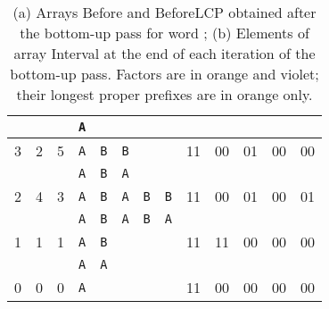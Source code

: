 \documentclass{llncs}
\newcommand{\Before}{\textsf{Before}}
\newcommand{\BeforeLCP}{\textsf{BeforeLCP}}
\newcommand{\Interval}{\textsf{Interval}}
\begin{document}
\begin{table}
\begin{center}
{{\begin{tabular}{|*{3}{c|}*{4}{c}*{6}{c|}}
 & & &\cellcolor{Thistle}\texttt{A}& & & & & & & & & \\ \hline
3&2&5&\cellcolor{Apricot}\texttt{A}&\cellcolor{Apricot}\texttt{B}&\cellcolor{Thistle}\texttt{B}& & &11&00&01&00&00\\ \hline
 & & &\cellcolor{Apricot}\texttt{A}&\cellcolor{Apricot}\texttt{B}&\cellcolor{Thistle}\texttt{A}& & & & & & & \\ \hline
2&4&3&\cellcolor{Apricot}\texttt{A}&\cellcolor{Apricot}\texttt{B}&\cellcolor{Apricot}\texttt{A}&\cellcolor{Apricot}\texttt{B}&\cellcolor{Thistle}\texttt{B}&11&00&01&00&01\\ \hline
 & & &\cellcolor{Apricot}\texttt{A}&\cellcolor{Apricot}\texttt{B}&\cellcolor{Apricot}\texttt{A}&\cellcolor{Apricot}\texttt{B}&\cellcolor{Thistle}\texttt{A}& & & & &\\ \hline
1&1&1&\cellcolor{Apricot}\texttt{A}&\cellcolor{Thistle}\texttt{B}& & & &11&11&00&00&00\\ \hline
 & & &\cellcolor{Apricot}\texttt{A}&\cellcolor{Thistle}\texttt{A}& & & & & & & &\\ \hline
0&0&0&\cellcolor{Thistle}\texttt{A}& & & & &11&00&00&00&00\\ \hline
\end{tabular}
}
}
  \end{center}
  \caption{(a) Arrays \Before{} and \BeforeLCP{} obtained after the bottom-up pass for word ; (b) Elements of array \Interval{} at the end of each iteration of the bottom-up pass. Factors  are in orange and violet; their longest proper prefixes are in orange only.}
\label{tab:bu}
\end{table}
\end{document}
